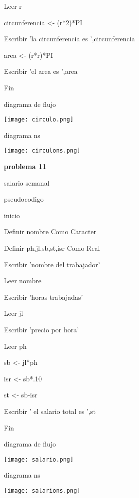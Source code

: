 \documentclass[10pt,a4paper]{article}
\begin{document}
\begin{multicols}{2}
	Leer r

	circunferencia <- (r*2)*PI

	Escribir 'la circunferencia es ',circunferencia

	area <- (r*r)*PI

	Escribir 'el area es ',area

Fin
  	
diagrama de flujo 

\texttt{[image: circulo.png]} 

diagrama ns 

\texttt{[image: circulons.png]} 	

\begin{center}
\textbf{problema 11}
\end{center}

salario semanal 

pseudocodigo 

inicio

Definir nombre Como Caracter

	Definir ph,jl,sb,st,isr Como Real

	Escribir 'nombre del trabajador'

	Leer nombre

	Escribir 'horas trabajadas'

	Leer jl

	Escribir 'precio por hora'

	Leer ph

	sb <- jl*ph

	isr <- sb*.10

	st <- sb-isr
	
	Escribir ' el salario total es ',st

Fin

diagrama de flujo 

\texttt{[image: salario.png]}

diagrama ns

\texttt{[image: salarions.png]}  
	
\end{multicols}
\end{document}
